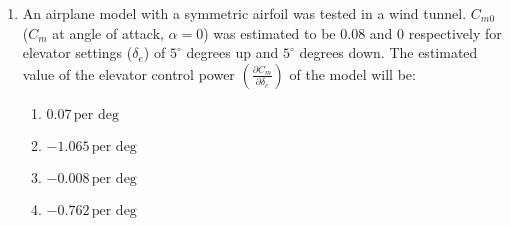 \documentclass[journal]{IEEEtran}
\numberwithin{equation}{enumi}
\numberwithin{figure}{enumi}
\begin{document}
\begin{enumerate}
\begin{multicols}{2}
\begin{enumerate}
        \item $2100 \, \text{kW}$
        \item $1371 \, \text{kW}$
        \item $6125 \, \text{kW}$
    \end{enumerate}
\end{multicols}
\bigskip
\item An airplane model with a symmetric airfoil was tested in a wind tunnel. $C_{m0}$ ($C_m$ at angle of attack, $\alpha = 0$) was estimated to be $0.08$ and $0$ respectively for elevator settings ($\delta_e$) of $5^\circ$ degrees up and $5^\circ$ degrees down. The estimated value of the elevator control power $\left(\frac{\partial C_m}{\partial \delta_e}\right)$ of the model will be:
\begin{multicols}{2}
    \begin{enumerate}
        \item $0.07 \, \text{per deg}$
        \item $-1.065 \, \text{per deg}$
        \item $-0.008 \, \text{per deg}$
        \item $-0.762 \, \text{per deg}$
    \end{enumerate}
\end{multicols}
\end{enumerate}
\end{document}
